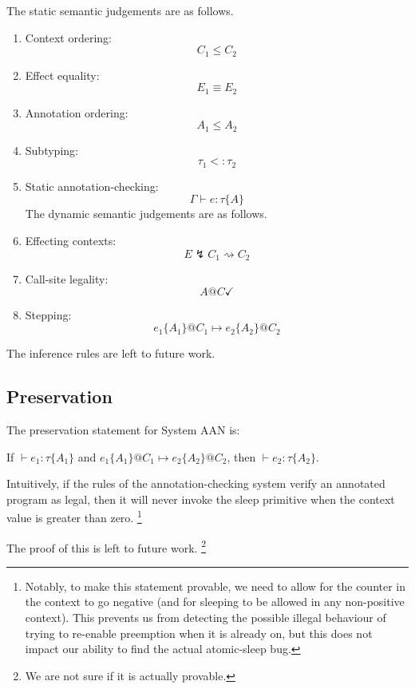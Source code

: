 \documentclass{article}
\begin{document}
The static semantic judgements are as follows.
\begin{enumerate}
	\item Context ordering: \[ C_1 \le C_2\]
	\item Effect equality: \[ E_1 \equiv E_2 \]
	\item Annotation ordering: \[ A_1 \le A_2 \]
	\item Subtyping: \[ \tau_1 <: \tau_2 \]
	\item Static annotation-checking: \[ \Gamma \vdash e : \tau \{A\} \]
The dynamic semantic judgements are as follows.
	\item Effecting contexts: \[ E \lightning C_1 \rightsquigarrow C_2 \]
	\item Call-site legality: \[ A @ C \checkmark \]
	\item Stepping: \[ e_1\{A_1\}@C_1 \mapsto e_2\{A_2\}@C_2 \]
\end{enumerate}

The inference rules are left to future work.

\subsection{Preservation}

The preservation statement for System AAN is:

\begin{center}
	If $\vdash e_1 : \tau\{A_1\}$ and $e_1\{A_1\}@C_1 \mapsto e_2\{A_2\}@C_2$, then $\vdash e_2 : \tau\{A_2\}$.
\end{center}

Intuitively, if the rules of the annotation-checking system verify an annotated program as legal, then it will never invoke the {\sf sleep} primitive when the context value is greater than zero.
\footnote{Notably, to make this statement provable, we need to allow for the counter in the context to go negative (and for sleeping to be allowed in any non-positive context). This prevents us from detecting the possible illegal behaviour of trying to re-enable preemption when it is already on, but this does not impact our ability to find the actual atomic-sleep bug.}

The proof of this is left to future work.
\footnote{We are not sure if it is actually provable.}
\end{document}
